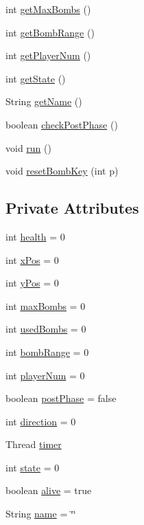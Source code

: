 \begin{DoxyCompactItemize}
\item 
int \hyperlink{class_player_a7bdbdb3d9b9419225f4a885da14728b5}{get\+Max\+Bombs} ()
\item 
int \hyperlink{class_player_ab11ac70ce6737ab6a7e8ffcda070bdfc}{get\+Bomb\+Range} ()
\item 
int \hyperlink{class_player_a152c1cbd89c6c73639d1e590db2bca9c}{get\+Player\+Num} ()
\item 
int \hyperlink{class_player_ac2518937ade66e10dc5093a6f7bdd8a6}{get\+State} ()
\item 
String \hyperlink{class_player_a7b17595bbe9876d4aa469ad9bee644dd}{get\+Name} ()
\item 
boolean \hyperlink{class_player_a18a27ee5d3e5d698a172391179e672a5}{check\+Post\+Phase} ()
\item 
void \hyperlink{class_player_ad470883cce200d3933fbf5c4ce6465a6}{run} ()
\item 
void \hyperlink{class_player_a3a45889c4b4bc78d219caed03dd04ec7}{reset\+Bomb\+Key} (int p)
\end{DoxyCompactItemize}
\subsection*{Private Attributes}
\begin{DoxyCompactItemize}
\item 
int \hyperlink{class_player_ab064f330cef84e2e062fd6446db24184}{health} = 0
\item 
int \hyperlink{class_player_a280608b62fdcd7f31cb54cf0787cff7f}{x\+Pos} = 0
\item 
int \hyperlink{class_player_aa2706c56cfb101d02b73e371cfb98cd1}{y\+Pos} = 0
\item 
int \hyperlink{class_player_acb502d33ffa4e20bd1d275126dc471ed}{max\+Bombs} = 0
\item 
int \hyperlink{class_player_ab6fd5604046c7ddee01bd5f9b9e69341}{used\+Bombs} = 0
\item 
int \hyperlink{class_player_ae8871f87983cdc59d20c9408b1db88af}{bomb\+Range} = 0
\item 
int \hyperlink{class_player_a497a7481dfd1f564d9cfcc45cc470e1f}{player\+Num} = 0
\item 
boolean \hyperlink{class_player_a961b7def0b24fdb72ded51d4bb15c6d0}{post\+Phase} = false
\item 
int \hyperlink{class_player_a43caa331c7c9f40c51862ad1ebb439ba}{direction} = 0
\item 
Thread \hyperlink{class_player_a2b205a0aba33f0cd4a4b6bbb9b03df35}{timer}
\item 
int \hyperlink{class_player_a73f30624033a23aa5bc290103528e77e}{state} = 0
\item 
boolean \hyperlink{class_player_a8e3ab9f7eed5d3b80be53d3b617d718b}{alive} = true
\item 
String \hyperlink{class_player_aa70e75b3cc209ea82a17c469de0f159c}{name} = \char`\"{}\char`\"{}
\end{DoxyCompactItemize}


